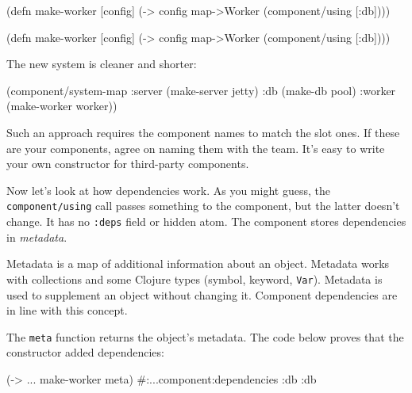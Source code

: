\ifnarrow

\begin{english}
  \begin{clojure}
(defn make-worker [config]
  (-> config
      map->Worker
      (component/using [:db])))
  \end{clojure}
\end{english}

\else

\begin{english}
  \begin{clojure}
(defn make-worker [config]
  (-> config map->Worker (component/using [:db])))
  \end{clojure}
\end{english}

\fi

\noindent
The new system is cleaner and shorter:

\begin{english}
  \begin{clojure}
(component/system-map
 :server (make-server jetty)
 :db     (make-db pool)
 :worker (make-worker worker))
  \end{clojure}
\end{english}

Such an approach requires the component names to match the slot ones. If these are your components, agree on naming them with the team. It's easy to write your own constructor for third-party components.


Now let's look at how dependencies work. As you might guess, the \verb|component/using| call passes something to the component, but the latter doesn't change. It has no \verb|:deps| field or hidden atom. The component stores dependencies in \emph{metadata}.

Metadata is a map of additional information about an object. Metadata works with collections and some Clojure types (symbol, keyword, \verb|Var|). Metadata is used to supplement an object without changing it. Component dependencies are in line with this concept.

The \verb|meta| function returns the object's metadata. The code below proves that the constructor added dependencies:

\ifnarrow

\begin{english}
  \begin{clojure}
(-> {...} make-worker meta)
#:...component{:dependencies {:db :db}}
  \end{clojure}
\end{english}

